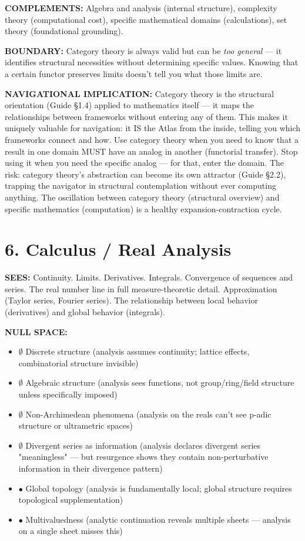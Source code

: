 \textbf{COMPLEMENTS:} Algebra and analysis (internal structure), complexity theory (computational cost), specific mathematical domains (calculations), set theory (foundational grounding).


\textbf{BOUNDARY:} Category theory is always valid but can be \textit{too general} — it identifies structural necessities without determining specific values. Knowing that a certain functor preserves limits doesn't tell you what those limits are.


\textbf{NAVIGATIONAL IMPLICATION:} Category theory is the structural orientation (Guide §1.4) applied to mathematics itself — it maps the relationships between frameworks without entering any of them. This makes it uniquely valuable for navigation: it IS the Atlas from the inside, telling you which frameworks connect and how. Use category theory when you need to know that a result in one domain MUST have an analog in another (functorial transfer). Stop using it when you need the specific analog — for that, enter the domain. The risk: category theory's abstraction can become its own attractor (Guide §2.2), trapping the navigator in structural contemplation without ever computing anything. The oscillation between category theory (structural overview) and specific mathematics (computation) is a healthy expansion-contraction cycle.


\bigskip\noindent\makebox[\textwidth]{\color{rulegray}\rule{5cm}{0.3pt}}\bigskip


\section*{6. Calculus / Real Analysis}


\textbf{SEES:} Continuity. Limits. Derivatives. Integrals. Convergence of sequences and series. The real number line in full measure-theoretic detail. Approximation (Taylor series, Fourier series). The relationship between local behavior (derivatives) and global behavior (integrals).


\textbf{NULL SPACE:}

\begin{itemize}[nosep,leftmargin=*]
  \item $\emptyset$ Discrete structure (analysis assumes continuity; lattice effects, combinatorial structure invisible)
  \item $\emptyset$ Algebraic structure (analysis sees functions, not group/ring/field structure unless specifically imposed)
  \item $\emptyset$ Non-Archimedean phenomena (analysis on the reals can't see p-adic structure or ultrametric spaces)
  \item $\emptyset$ Divergent series as information (analysis declares divergent series "meaningless" — but resurgence shows they contain non-perturbative information in their divergence pattern)
  \item $\bullet$ Global topology (analysis is fundamentally local; global structure requires topological supplementation)
  \item $\bullet$ Multivaluedness (analytic continuation reveals multiple sheets — analysis on a single sheet misses this)
\end{itemize}


